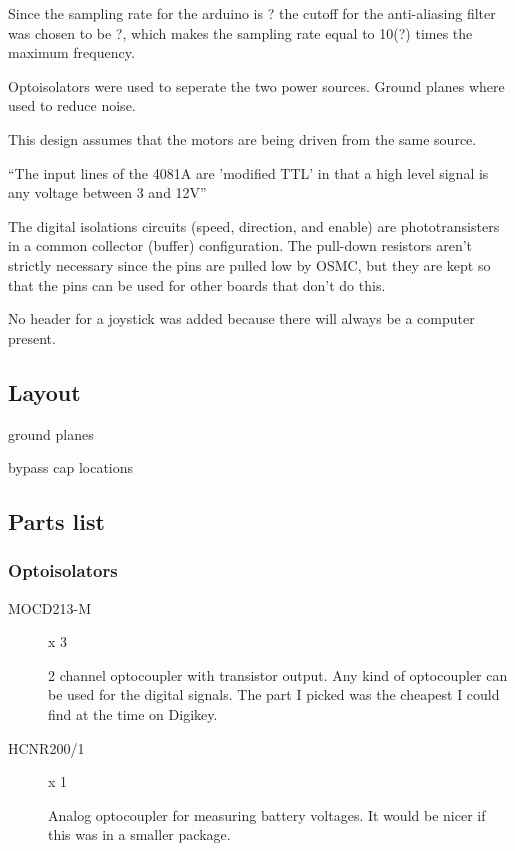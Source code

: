 \documentclass[letterpaper,12pt,notitlepage]{report}
\begin{document}
Since the sampling rate for the arduino is ? the cutoff for the anti-aliasing filter was chosen to be ?, which makes the sampling rate equal to 10(?) times the maximum frequency.

Optoisolators were used to seperate the two power sources.  Ground planes where used to reduce noise.

This design assumes that the motors are being driven from the same source.

\textquotedblleft The input lines of the 4081A are 'modified TTL' in that a high level signal is any voltage between 3 and 12V\textquotedblright

The digital isolations circuits (speed, direction, and enable) are phototransisters in a common collector (buffer) configuration.  The pull-down resistors aren't strictly necessary since the pins are pulled low by OSMC, but they are kept so that the pins can be used for other boards that don't do this.


No header for a joystick was added because there will always be a computer present.

\subsection{Layout}

ground planes

bypass cap locations

\subsection{Parts list}
\subsubsection{Optoisolators}
\begin{description}
 \item[MOCD213-M] x 3

2 channel optocoupler with transistor output.  Any kind of optocoupler can be used for the digital signals.  The part I picked was the cheapest I could find at the time on Digikey.

 \item[HCNR200/1] x 1

Analog optocoupler for measuring battery voltages.  It would be nicer if this was in a smaller package.

\end{description}
\end{document}
